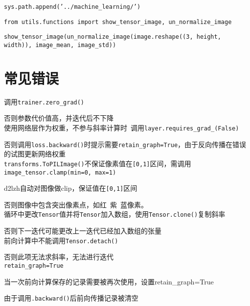 \documentclass[UTF8]{ctexart}
\begin{document}
  \texttt{sys.path.append('../machine\_learning/')}

  \texttt{from utils.functions import show\_tensor\_image, un\_normalize\_image}

  \texttt{show\_tensor\_image(un\_normalize\_image(image.reshape((3, height, width)), image\_mean, image\_std))}

\section{常见错误}
\noindent 调用\texttt{trainer.zero\_grad()}

  否则参数代价值高，并迭代后不下降\\
使用网络层作为权重，不参与斜率计算时\ 调用\texttt{layer.requires\_grad\_(False)}

  否则调用\texttt{loss.backward()}时提示需要\texttt{retain\_graph=True}，由于反向传播在错误的试图更新网络权重\\
\texttt{transforms.ToPILImage()}不保证像素值在\texttt{[0,1]}区间，需调用\texttt{image\_tensor.clamp(min=0, max=1)}

  d2lzh自动对图像做clip，保证值在\texttt{[0,1]}区间
  
  否则图像中包含突出像素点，如红\ 紫\ 蓝像素。\\
循环中更改\texttt{Tensor}值并将\texttt{Tensor}加入数组，使用\texttt{Tensor.clone()}复制斜率

  否则下一迭代可能更改上一迭代已经加入数组的张量\\
前向计算中不能调用\texttt{Tensor.detach()}

  否则此项无法求斜率，无法进行迭代\\
\texttt{retain\_graph=True}

  当一次前向计算保存的记录需要被再次使用，设置retain\_graph=True 

  由于调用\texttt{.backward()}后前向传播记录被清空
\end{document}
